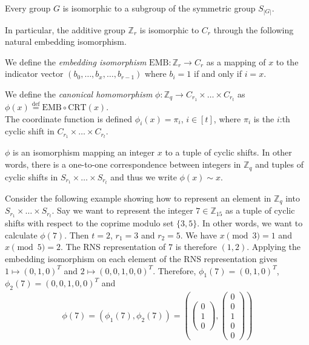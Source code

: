 \begin{theorem}
    Every group $G$ is isomorphic to a subgroup of the symmetric group $S_{|G|}$.
\end{theorem}
In particular, the additive group $\mathbb{Z}_r$ is isomorphic to $C_r$ through the following natural embedding isomorphism.
\begin{definition}
    We define the \textit{embedding isomorphism} $\textrm{EMB} \colon \mathbb{Z}_r \rightarrow C_r$ as a mapping of $x$ to the indicator vector $(b_0, \dots, b_x, \dots, b_{r-1})$ where $b_i = 1$ if and only if $i = x$.
\end{definition}

\begin{definition}\label{def:canonical-homomorphism}
    We define the \textit{canonical homomorphism} $\phi \colon \mathbb{Z}_q \to C_{r_1} \times \dots \times C_{r_t}$ as $\phi(x) \stackrel{\mathrm{def}}{=} \textrm{EMB} \circ \textrm{CRT} (x)$.\\
    The coordinate function is defined $\phi_i(x) = \pi_i$, $i \in [t]$, where $\pi_i$ is the $i$:th cyclic shift in $C_{r_1} \times \dots \times C_{r_t}$.
\end{definition}

$\phi$ is an isomorphism mapping an integer $x$ to a tuple of cyclic shifts. In other words, there is a one-to-one correspondence between integers in $\mathbb{Z}_q$ and tuples of cyclic shifts in $S_{r_1} \times \dots \times S_{r_t}$ and thus we write $\phi(x) \sim x$.

Consider the following example showing how to represent an element in $\mathbb{Z}_q$ into $S_{r_1} \times \dots \times S_{r_t}$.
Say we want to represent the integer $7 \in \mathbb{Z}_{15}$ as a tuple of cyclic shifts with respect to the coprime modulo set $\{3,5\}$. In other words, we want to calculate $\phi(7)$. Then $t = 2$, $r_1 = 3$ and $r_2 = 5$. We have $x \pmod 3 = 1$ and $x \pmod 5 = 2$. The RNS representation of $7$ is therefore $(1,2)$. Applying the embedding isomorphism on each element of the RNS representation gives $1 \mapsto (0,1,0)^T$ and $2 \mapsto (0,0,1,0,0)^T$. Therefore, $\phi_1(7) = (0,1,0)^T$, $\phi_2(7) = (0,0,1,0,0)^T$ and
\begin{equation*}
    \begin{aligned}
        \phi(7) = (\phi_1(7), \phi_2(7)) = (\begin{pmatrix}
            0 \\
            1 \\
            0
        \end{pmatrix}, \begin{pmatrix}
            0 \\
            0 \\
            1 \\
            0 \\
            0
        \end{pmatrix})
    \end{aligned}
\end{equation*}

